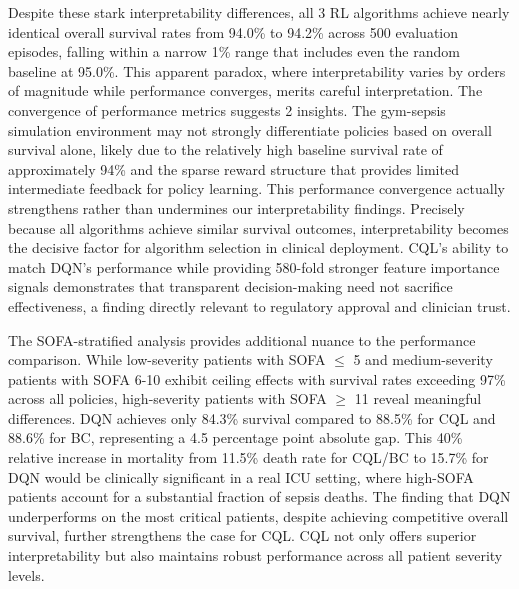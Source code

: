 Despite these stark interpretability differences, all 3 RL algorithms achieve nearly identical overall survival rates from 94.0\% to 94.2\% across 500 evaluation episodes, falling within a narrow 1\% range that includes even the random baseline at 95.0\%. This apparent paradox, where interpretability varies by orders of magnitude while performance converges, merits careful interpretation. The convergence of performance metrics suggests 2 insights. The gym-sepsis simulation environment may not strongly differentiate policies based on overall survival alone, likely due to the relatively high baseline survival rate of approximately 94\% and the sparse reward structure that provides limited intermediate feedback for policy learning. This performance convergence actually strengthens rather than undermines our interpretability findings. Precisely because all algorithms achieve similar survival outcomes, interpretability becomes the decisive factor for algorithm selection in clinical deployment. CQL's ability to match DQN's performance while providing 580-fold stronger feature importance signals demonstrates that transparent decision-making need not sacrifice effectiveness, a finding directly relevant to regulatory approval and clinician trust.

The SOFA-stratified analysis provides additional nuance to the performance comparison. While low-severity patients with SOFA $\leq$ 5 and medium-severity patients with SOFA 6-10 exhibit ceiling effects with survival rates exceeding 97\% across all policies, high-severity patients with SOFA $\geq$ 11 reveal meaningful differences. DQN achieves only 84.3\% survival compared to 88.5\% for CQL and 88.6\% for BC, representing a 4.5 percentage point absolute gap. This 40\% relative increase in mortality from 11.5\% death rate for CQL/BC to 15.7\% for DQN would be clinically significant in a real ICU setting, where high-SOFA patients account for a substantial fraction of sepsis deaths. The finding that DQN underperforms on the most critical patients, despite achieving competitive overall survival, further strengthens the case for CQL. CQL not only offers superior interpretability but also maintains robust performance across all patient severity levels.

